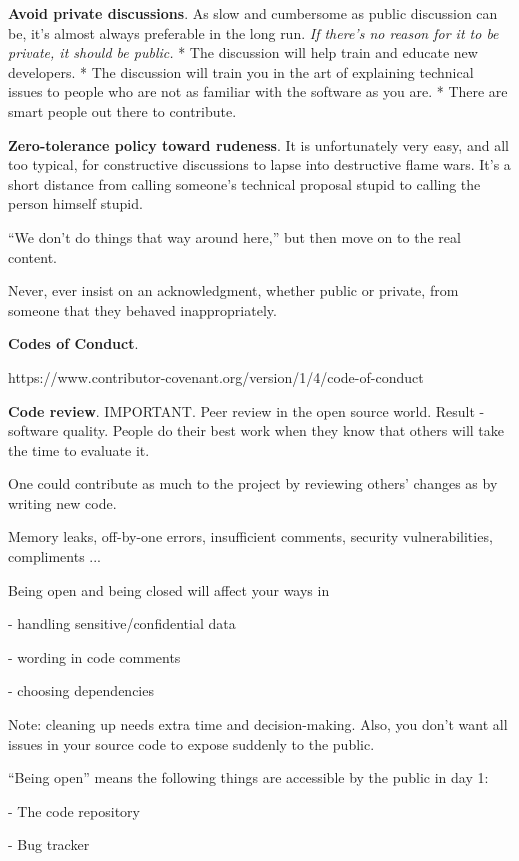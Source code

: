 \documentclass[landscape,30pt]{foils}
\begin{document}
{\bf Avoid private discussions}. As slow and cumbersome as public discussion can be, it's almost always preferable in the long run. {\em If there's no reason for it to be private, it should be public.}  * The discussion will help train and educate new developers.   *  The discussion will train you in the art of explaining technical issues to people who are not as familiar with the software as you are.   * There are smart people out there to contribute.

{\bf Zero-tolerance policy toward rudeness}.  It is unfortunately very
easy, and all too typical, for constructive discussions to lapse into
destructive flame wars.  It's a short distance from calling someone's
technical proposal stupid to calling the person himself stupid.

``We don't do things that way around here,'' but then move on to the
real content.

Never, ever insist on an acknowledgment, whether public
or private, from someone that they behaved inappropriately.

{\bf Codes of Conduct}.

https://www.contributor-covenant.org/version/1/4/code-of-conduct

{\bf Code review}.  IMPORTANT.  Peer review in the open source world.
Result - software quality.  People do their best work when they know
that others will take the time to evaluate it.

One could contribute as much to the project by reviewing others'
changes as by writing new code.

Memory leaks, off-by-one errors, insufficient comments, security vulnerabilities, compliments ...


Being open and being closed will affect your ways in

- handling sensitive/confidential data

- wording in code comments

- choosing dependencies 

Note: cleaning up needs extra time and decision-making.  Also, you don't want all issues in your source code to expose suddenly to the public.

``Being open'' means the following things are accessible by the public in day 1:

- The code repository

- Bug tracker
\end{document}
